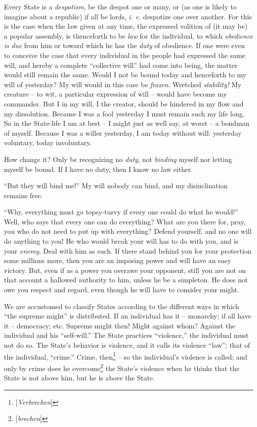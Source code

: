 \documentclass[12pt,a4paper]{book}
\begin{document}
Every State is a \textit{despotism}, be the despot one or many, or (as one is 
likely to imagine about a republic) if all be lords, \textit{i. e.} despotize 
one over another. For this is the case when the law given at any time, the 
expressed volition of (it may be) a popular assembly, is thenceforth to be 
\textit{law} for the individual, to which \textit{obedience is due} from him 
or toward which he has the \textit{duty} of obedience. If one were even to 
conceive the case that every individual in the people had expressed the same 
will, and hereby a complete ``collective will'' had come into being, the 
matter would still remain the same. Would I not be bound today and henceforth 
to my will of yesterday? My will would in this case be \textit{frozen}. 
Wretched \textit{stability!} My creature -- to wit, a particular expression of 
will -- would have become my commander. But I in my will, I the creator, 
should be hindered in my flow and my dissolution. Because I was a fool 
yesterday I must remain such my life long. So in the State-life I am at best 
-- I might just as well say, at worst -- a bondman of myself. Because I was a 
willer yesterday, I am today without will: yesterday voluntary, today 
involuntary.

How change it? Only be recognizing no \textit{duty}, not \textit{binding} 
myself nor letting myself be bound. If I have no duty, then I know no law 
either.

``But they will bind me!'' My will nobody can bind, and my disinclination 
remains free.

``Why, everything must go topsy-turvy if every one could do what he would!'' 
Well, who says that every one can do everything? What are you there for, pray, 
you who do not need to put up with everything? Defend yourself, and no one 
will do anything to you! He who would break your will has to do with you, and 
is your \textit{enemy}. Deal with him as such. If there stand behind you for 
your protection some millions more, then you are an imposing power and will 
have an easy victory. But, even if as a power you overawe your opponent, still 
you are not on that account a hallowed authority to him, unless he be a 
simpleton. He does not owe you respect and regard, even though he will have to 
consider your might.

We are accustomed to classify States according to the different ways in which 
``the supreme might'' is distributed. If an individual has it -- monarchy; 
if all have it -- democracy; etc. Supreme might then! Might against whom? 
Against the individual and his ``self-will.'' The State practices 
``violence,'' the individual must not do so. The State's behavior is 
violence, and it calls its violence ``law''; that of the individual, 
``crime.'' Crime, then\footnote{[\textit{Verbrechen}]} -- so the 
individual's violence is called; and only by crime does he 
overcome\footnote{[\textit{brechen}]} the State's violence when he thinks that 
the State is not above him, but he is above the State.
\end{document}
